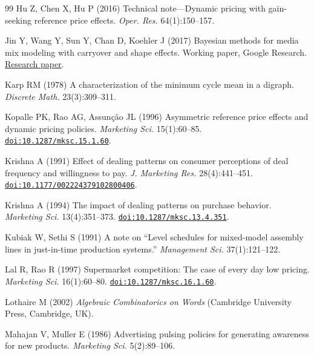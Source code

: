 \begin{thebibliography}{99}
 {\color{black} Hu Z, Chen X, Hu P (2016) Technical note---Dynamic pricing with gain-seeking reference price effects. \emph{Oper. Res.} 64(1):150--157.}

Jin Y, Wang Y, Sun Y, Chan D, Koehler J (2017) Bayesian methods for media mix modeling with carryover and shape effects. Working paper, Google Research. \href{https://storage.googleapis.com/gweb-research2023-media/pubtools/pdf/b20467a5c27b86c08cceed56fc72ceadb875184a.pdf}{Research paper}.

Karp RM (1978) A characterization of the minimum cycle mean in a digraph. \emph{Discrete Math.} 23(3):309--311.

Kopalle PK, Rao AG, Assun\c{c}\~ao JL (1996) Asymmetric reference price effects and dynamic pricing policies. \emph{Marketing Sci.} 15(1):60--85. \href{https://doi.org/10.1287/mksc.15.1.60}{\nolinkurl{doi:10.1287/mksc.15.1.60}}.

Krishna A (1991) Effect of dealing patterns on consumer perceptions of deal frequency and willingness to pay. \emph{J. Marketing Res.} 28(4):441--451. \href{https://doi.org/10.1177/002224379102800406}{\nolinkurl{doi:10.1177/002224379102800406}}.

Krishna A (1994) The impact of dealing patterns on purchase behavior. \emph{Marketing Sci.} 13(4):351--373. \href{https://doi.org/10.1287/mksc.13.4.351}{\nolinkurl{doi:10.1287/mksc.13.4.351}}.

 {\color{black} Kubiak W, Sethi S (1991) A note on ``Level schedules for mixed-model assembly lines in just-in-time production systems.'' \emph{Management Sci.} 37(1):121--122.}

Lal R, Rao R (1997) Supermarket competition: The case of every day low pricing. \emph{Marketing Sci.} 16(1):60--80. \href{https://doi.org/10.1287/mksc.16.1.60}{\nolinkurl{doi:10.1287/mksc.16.1.60}}.




 {\color{black} Lothaire M (2002) \emph{Algebraic Combinatorics on Words} (Cambridge University Press, Cambridge, UK).}

 {\color{black} Mahajan V, Muller E (1986) Advertising pulsing policies for generating awareness for new products. \emph{Marketing Sci.} 5(2):89--106.}


\end{thebibliography}
